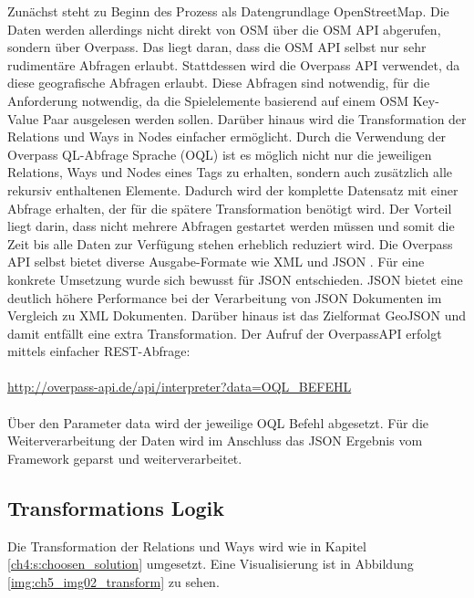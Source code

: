 Zunächst steht zu Beginn des Prozess als Datengrundlage OpenStreetMap.
Die Daten werden allerdings nicht direkt von OSM über die OSM API abgerufen, sondern über Overpass. Das liegt daran, dass die OSM API selbst nur sehr rudimentäre Abfragen erlaubt.
Stattdessen wird die Overpass API verwendet, da diese geografische Abfragen erlaubt.\cite{Meyer.2013}
Diese Abfragen sind notwendig, für die Anforderung notwendig, da die Spielelemente basierend auf einem OSM Key-Value Paar ausgelesen werden sollen. Darüber hinaus wird die Transformation der Relations und Ways in Nodes einfacher ermöglicht.
Durch die Verwendung der Overpass QL-Abfrage Sprache (OQL) ist es möglich nicht nur die jeweiligen Relations, Ways und Nodes eines Tags zu erhalten, sondern auch zusätzlich alle rekursiv enthaltenen Elemente. Dadurch wird der komplette Datensatz mit einer Abfrage erhalten, der für die spätere Transformation benötigt wird. Der Vorteil liegt darin, dass nicht mehrere Abfragen gestartet werden müssen und somit die Zeit bis alle Daten zur Verfügung stehen erheblich reduziert wird. Die Overpass API selbst bietet diverse Ausgabe-Formate wie XML und JSON \cite{Olbricht.2014}. Für eine konkrete Umsetzung wurde sich bewusst für JSON entschieden. JSON bietet eine deutlich höhere Performance bei der Verarbeitung von JSON Dokumenten im Vergleich zu XML Dokumenten.\cite{Nurseitov.2009} Darüber hinaus ist das Zielformat GeoJSON und damit entfällt eine extra Transformation.
Der Aufruf der OverpassAPI erfolgt mittels einfacher REST-Abfrage:
\\\\
\url{http://overpass-api.de/api/interpreter?data=OQL_BEFEHL}
\\\\
Über den Parameter \glqq data\grqq{} wird der jeweilige OQL Befehl abgesetzt.
Für die Weiterverarbeitung der Daten wird im Anschluss das JSON Ergebnis vom Framework geparst und weiterverarbeitet.

\subsection*{Transformations Logik}

Die Transformation der Relations und Ways wird wie in Kapitel \ref{ch4:s:choosen_solution} umgesetzt. Eine Visualisierung ist in Abbildung \ref{img:ch5_img02_transform} zu sehen.

